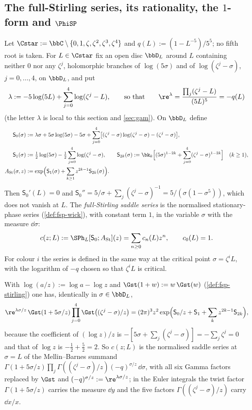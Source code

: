 
\subsection{The full-Stirling series, its rationality, the \texorpdfstring{$1$}{1}-form and \texorpdfstring{$\PhiSP$}{the full-Stirling WKB function}}
\label{sec:con-form}

\begin{defn}
\label{def:gam-c}
Let $\Cstar:=\bbC\setminus\{0,1,\zeta,\zeta^2,\zeta^3,\zeta^4\}$ and $q(L):=(1-L^{-5})/5^5$; no fifth root is taken. For $L\in\Cstar$ fix an open disc $\bbD_L$ around $L$ containing neither $0$ nor any $\zeta^j$, holomorphic branches of $\log(5\sigma)$ and of $\log(\zeta^j-\sigma)$, $j=0,\dots,4$, on $\bbD_L$, and put
\[
\lambda:=-5\log(5L)+\sum_{j=0}^4\log(\zeta^j-L),\qquad\text{so that}\qquad \re^{\lambda}=\frac{\prod_j(\zeta^j-L)}{(5L)^5}=-q(L)
\]
(the letter $\lambda$ is local to this section and \cref{sec:gam}). On $\bbD_L$ define
\begin{align*}
\mathsf S_0(\sigma)&:=\lambda\sigma+5\sigma\log(5\sigma)-5\sigma+\sum_{j=0}^4\bigl[(\zeta^j-\sigma)\log(\zeta^j-\sigma)-(\zeta^j-\sigma)\bigr],\\
\mathsf S_1(\sigma)&:=\tfrac12\log(5\sigma)-\tfrac12\sum_{j=0}^4\log(\zeta^j-\sigma),\qquad
\mathsf S_{2k}(\sigma):=\bk_k\Bigl[(5\sigma)^{1-2k}+\sum_{j=0}^4(\zeta^j-\sigma)^{1-2k}\Bigr]\quad(k\geq1),\\
A_{\mathrm{St}}(\sigma,z)&:=\exp\Bigl(\mathsf S_1(\sigma)+\sum_{k\geq1}z^{2k-1}\mathsf S_{2k}(\sigma)\Bigr).
\end{align*}
Then $\mathsf S_0'(L)=0$ and $\mathsf S_0''=5/\sigma+\sum_j(\zeta^j-\sigma)^{-1}=5/(\sigma(1-\sigma^5))$, which does not vanish at $L$. The \emph{full-Stirling saddle series} is the normalised stationary-phase series (\cref{def:fsp-wick}), with constant term $1$, in the variable $\sigma$ with the measure $\dd\sigma$:
\[
c(z;L):=\SPh_L[\mathsf S_0;A_{\mathrm{St}}](z)=\sum_{n\geq0}c_n(L)z^n,\qquad c_0(L)=1 .
\]
For colour $i$ the series is defined in the same way at the critical point $\sigma=\zeta^iL$, with the logarithm of $-q$ chosen so that $\zeta^iL$ is critical.
\end{defn}

With $\log(a/z):=\log a-\log z$ and $\Gst(1+w):=w\,\Gst(w)$ (\cref{def:fsp-stirling}) one has, identically in $\sigma\in\bbD_L$,
\[
\re^{\lambda\sigma/z}\,\Gst(1+5\sigma/z)\prod_{j=0}^4\Gst\bigl((\zeta^j-\sigma)/z\bigr)=(2\pi)^3z^2\exp\Bigl(\mathsf S_0/z+\mathsf S_1+\sum_kz^{2k-1}\mathsf S_{2k}\Bigr),
\]
because the coefficient of $(\log z)/z$ is $-[5\sigma+\sum_j(\zeta^j-\sigma)]=-\sum_j\zeta^j=0$ and that of $\log z$ is $-\frac12+\frac52=2$. So $c(z;L)$ is the normalised saddle series at $\sigma=L$ of the Mellin--Barnes summand $\Gamma(1+5\sigma/z)\prod_j\Gamma((\zeta^j-\sigma)/z)(-q)^{\sigma/z}\,\dd\sigma$, with all six Gamma factors replaced by $\Gst$ and $(-q)^{\sigma/z}:=\re^{\lambda\sigma/z}$; in the Euler integrals the twist factor $\Gamma(1+5\sigma/z)$ carries the measure $\dd y$ and the five factors $\Gamma((\zeta^j-\sigma)/z)$ carry $\dd x/x$.

